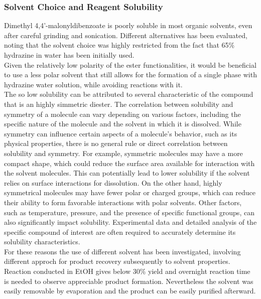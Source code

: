 \documentclass[../Master.tex]{subfiles}
\begin{document}
\subsubsection{Solvent Choice and Reagent Solubility}\label{sec:solvent}

Dimethyl 4,4’-malonyldibenzoate is poorly soluble in most organic solvents, even after careful grinding and sonication. Different alternatives has been evaluated, noting that the solvent choice was highly restricted from the fact that 65\% hydrazine in water has been initially used. \\
Given the relatively low polarity of the ester functionalities, it would be beneficial to use a less polar solvent that still allows for the formation of a single phase with hydrazine water solution, while avoiding reactions with it.\\
The so low solubility can be attributed to several characteristic of the compound that is an highly simmetric diester. The correlation between solubility and symmetry of a molecule can vary depending on various factors, including the specific nature of the molecule and the solvent in which it is dissolved. While symmetry can influence certain aspects of a molecule's behavior, such as its physical properties, there is no general rule or direct correlation between solubility and symmetry. For example, symmetric molecules may have a more compact shape, which could reduce the surface area available for interaction with the solvent molecules. This can potentially lead to lower solubility if the solvent relies on surface interactions for dissolution. On the other hand, highly symmetrical molecules may have fewer polar or charged groups, which can reduce their ability to form favorable interactions with polar solvents. Other factors, such as temperature, pressure, and the presence of specific functional groups, can also significantly impact solubility. Experimental data and detailed analysis of the specific compound of interest are often required to accurately determine its solubility characteristics.\\
For these reasons the use of different solvent has been investigated, involving different approch for product recovery subsequently to solvent properties. \\
Reaction conducted in EtOH gives below 30\% yield and overnight reaction time is needed to observe appreciable product formation. Nevertheless the solvent was easily removable by evaporation and the product can be easily purified afterward.\\
\end{document}
